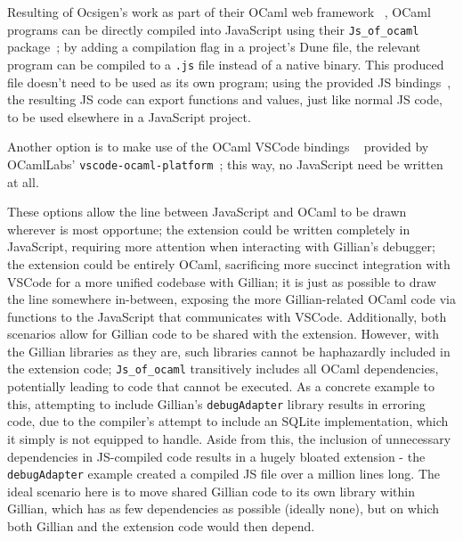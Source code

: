 Resulting of Ocsigen's work as part of their OCaml web framework
~\cite{ocsigen-framework}, OCaml programs can be directly compiled into
JavaScript using their \texttt{Js\_of\_ocaml} package~\cite{js-of-ocaml}; by
adding a compilation flag in a project's Dune file, the relevant program can be
compiled to a \texttt{.js} file instead of a native binary. This produced file
doesn't need to be used as its own program; using the provided JS
bindings~\cite{js-of-ocaml-bindings}, the resulting JS code can export
functions and values, just like normal JS code, to be used elsewhere in a
JavaScript project.

Another option is to make use of the OCaml VSCode bindings
~\cite{vscode-ocaml-bindings} provided by OCamlLabs'
\texttt{vscode-ocaml-platform}~\cite{vscode-ocaml-platform, ocamllabs}; this
way, no JavaScript need be written at all.

These options allow the line between JavaScript and OCaml to be drawn wherever
is most opportune; the extension could be written completely in JavaScript,
requiring more attention when interacting with Gillian's debugger; the
extension could be entirely OCaml, sacrificing more succinct integration with
VSCode for a more unified codebase with Gillian; it is just as possible to draw
the line somewhere in-between, exposing the more Gillian-related OCaml code via
functions to the JavaScript that communicates with VSCode. Additionally, both
scenarios allow for Gillian code to be shared with the extension. However,
with the Gillian libraries as they are, such libraries cannot be haphazardly
included in the extension code; \texttt{Js\_of\_ocaml} transitively includes all
OCaml dependencies, potentially leading to code that cannot be executed. As a
concrete example to this, attempting to include Gillian's \texttt{debugAdapter}
library results in erroring code, due to the compiler's attempt to include an
SQLite implementation, which it simply is not equipped to handle. Aside from
this, the inclusion of unnecessary dependencies in JS-compiled code results in
a hugely bloated extension - the \texttt{debugAdapter} example created a
compiled JS file over a million lines long. The ideal scenario here is to move
shared Gillian code to its own library within Gillian, which has as few
dependencies as possible (ideally none), but on which both Gillian and the
extension code would then depend.

